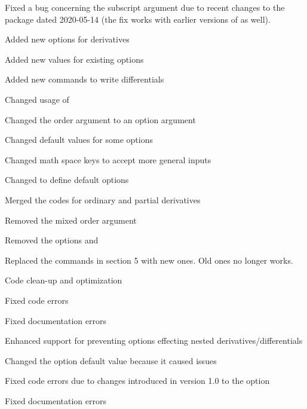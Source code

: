 \begin{changelog}
\begin{change}[version = 0.98, date = 2020-07-20, beta = true]
			\item Fixed a bug concerning the subscript argument due to recent changes to the  package dated 2020-05-14 (the fix works with earlier versions of  as well).
		\end{change}
		\begin{change}[version = 1.0, date = 2021-05-25, beta = false]
			\item Added new options for derivatives
			\item Added new values for existing options
			\item Added new commands to write differentials
			\item Changed usage of 
			\item Changed the order argument to an option argument
			\item Changed default values for some options
			\item Changed math space keys to accept more general inputs
			\item Changed  to define default options
			\item Merged the codes for ordinary and partial derivatives
			\item Removed the mixed order argument
			\item Removed the options  and 
			\item Replaced the commands in section 5 with new ones. Old ones no longer works.
			\item Code clean-up and optimization
			\item Fixed code errors
			\item Fixed documentation errors
			\item Enhanced support for preventing options effecting nested derivatives/differentials
		\end{change}
		\begin{change}[version = 1.01, date = 2021-05-28, beta = false]
			\item Changed the option  default value because it caused issues
			\item Fixed code errors due to changes introduced in version 1.0 to the option 
			\item Fixed documentation errors
		\end{change}
		\begin{change}[version = 1.1, date = 2021-06-03, beta = false]

\end{change}
\end{changelog}
